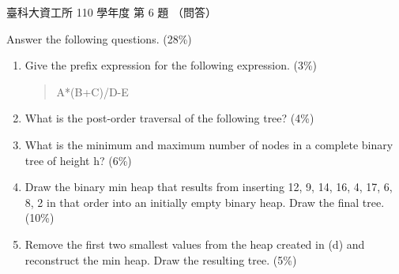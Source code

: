 \begin{pastexam}[label={px:ntust-110-ice-06}]{臺科大資工所 110 學年度 第 6 題}
（問答）

Answer the following questions. (28\%)
\begin{enumerate}[label=(\alph*)]
\item Give the prefix expression for the following expression. (3\%)
\begin{quote}A*(B+C)/D-E\end{quote}
\item What is the post-order traversal of the following tree? (4\%)

\begin{center}
\end{center}
\item What is the minimum and maximum number of nodes in a complete binary tree of height h? (6\%)
\item Draw the binary min heap that results from inserting 12, 9, 14, 16, 4, 17, 6, 8, 2 in that
order into an initially empty binary heap. Draw the final tree. (10\%)
\item Remove the first two smallest values from the heap created in (d) and reconstruct the min
heap. Draw the resulting tree. (5\%)
\end{enumerate}
\end{pastexam}

